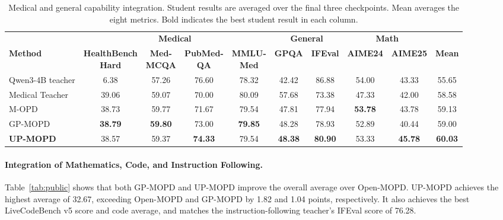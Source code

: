 \documentclass{article}
\begin{document}
\begin{table}[t]
\centering
\caption{Medical and general capability integration. Student results are averaged over the final three checkpoints. Mean averages the eight metrics. Bold indicates the best student result in each column.}
\label{tab:1}
\renewcommand{\arraystretch}{1.08}
\scriptsize
\setlength{\tabcolsep}{3pt}
\begin{tabular*}{\linewidth}{@{\extracolsep{\fill}}lccccccccc@{}}
\toprule
& \multicolumn{4}{c}{\textbf{Medical}}
& \multicolumn{2}{c}{\textbf{General}}
& \multicolumn{2}{c}{\textbf{Math}} & \\
\cmidrule(lr){2-5}\cmidrule(lr){6-7}\cmidrule(lr){8-9}
\textbf{Method}
& \shortstack{\textbf{HealthBench}\\\textbf{Hard}}
& \shortstack{\textbf{Med-}\\\textbf{MCQA}}
& \shortstack{\textbf{PubMed-}\\\textbf{QA}}
& \shortstack{\textbf{MMLU-}\\\textbf{Med}}
& \textbf{GPQA} & \textbf{IFEval}
& \textbf{AIME24} & \textbf{AIME25} & \textbf{Mean} \\
\midrule
Qwen3-4B teacher & 6.38 & 57.26 & 76.60 & 78.32 & 42.42 & 86.88 & 54.00 & 43.33 & 55.65 \\
Medical Teacher & 39.06 & 59.07 & 70.00 & 80.09 & 57.68 & 73.38 & 47.33 & 42.00 & 58.58 \\
\midrule
M-OPD & 38.73 & 59.77 & 71.67 & 79.54 & 47.81 & 77.94 & \textbf{53.78} & 43.78 & 59.13 \\
GP-MOPD & \textbf{38.79} & \textbf{59.80} & 73.00 & \textbf{79.85} & 48.28 & 78.93 & 52.89 & 40.44 & 59.00 \\
\midrule
\rowcolor{uprow}\textbf{UP-MOPD} & 38.57 & 59.37 & \textbf{74.33} & 79.54 & \textbf{48.38} & \textbf{80.90} & 53.33 & \textbf{45.78} & \textbf{60.03} \\
\bottomrule
\end{tabular*}
\end{table}

\paragraph{Integration of Mathematics, Code, and Instruction Following.}
Table~\ref{tab:public} shows that both GP-MOPD and UP-MOPD improve the overall average over Open-MOPD. UP-MOPD achieves the highest average of 32.67, exceeding Open-MOPD and GP-MOPD by 1.82 and 1.04 points, respectively. It also achieves the best LiveCodeBench v5 score and code average, and matches the instruction-following teacher's IFEval score of 76.28.
\end{document}
